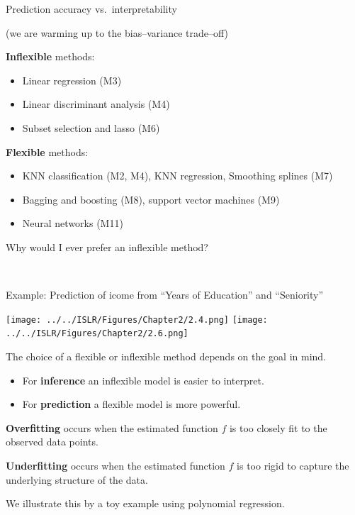 \documentclass[ignorenonframetext,]{beamer}
\providecommand{\tightlist}{%
  \setlength{\itemsep}{0pt}\setlength{\parskip}{0pt}}
\begin{document}
\begin{frame}{Prediction accuracy vs.~interpretability}

(we are warming up to the bias--variance trade--off)

\textbf{Inflexible} methods:

\begin{itemize}
\tightlist
\item
  Linear regression (M3)
\item
  Linear discriminant analysis (M4)
\item
  Subset selection and lasso (M6)
\end{itemize}

\textbf{Flexible} methods:

\begin{itemize}
\tightlist
\item
  KNN classification (M2, M4), KNN regression, Smoothing splines (M7)
\item
  Bagging and boosting (M8), support vector machines (M9)
\item
  Neural networks (M11)
\end{itemize}

\end{frame}

\begin{frame}

\begin{block}{Why would I ever prefer an inflexible method?}

\(~\)

Example: Prediction of icome from ``Years of Education'' and
``Seniority''\vspace{2mm}

\centering
\texttt{[image: ../../ISLR/Figures/Chapter2/2.4.png]}
\texttt{[image: ../../ISLR/Figures/Chapter2/2.6.png]}

\end{block}

\end{frame}

\begin{frame}

The choice of a flexible or inflexible method depends on the goal in
mind.

\begin{itemize}
\tightlist
\item
  For \textbf{inference} an inflexible model is easier to interpret.
\item
  For \textbf{prediction} a flexible model is more powerful.
\end{itemize}

\textbf{Overfitting} occurs when the estimated function \(f\) is too
closely fit to the observed data points.

\textbf{Underfitting} occurs when the estimated function \(f\) is too
rigid to capture the underlying structure of the data.

We illustrate this by a toy example using polynomial regression.

\end{frame}
\end{document}
